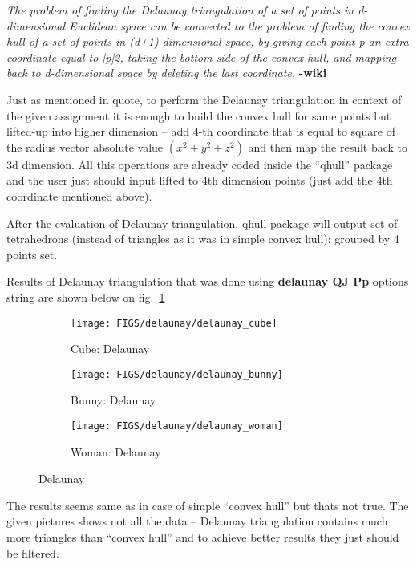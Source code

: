 \documentclass[11pt]{article}
\begin{document}
\textit{The problem of finding the Delaunay triangulation of a set of points in d-dimensional Euclidean space can be converted to the problem of finding the convex hull of a set of points in (d+1)-dimensional space, by giving each point p an extra coordinate equal to |p|2, taking the bottom side of the convex hull, and mapping back to d-dimensional space by deleting the last coordinate.} \textbf{-wiki}

Just as mentioned in quote, to perform the Delaunay triangulation in context of the given assignment it is enough to build the convex hull for same points but lifted-up into higher dimension – add 4-th coordinate that is equal to square of the radius vector absolute value $(x^2+y^2+z^2)$ and then map the result back to 3d dimension. All this operations are already coded inside the “qhull” package and the user just should input lifted to 4th dimension points (just add the 4th coordinate mentioned above).

After the evaluation of Delaunay triangulation, qhull package will output set of tetrahedrons (instead of triangles as it was in simple convex hull): grouped by 4 points set.

Results of Delaunay triangulation that was done using \textbf{delaunay QJ Pp} options string are shown below on fig.~\ref{fig:delaunay}
\begin{figure}[h]
    \begin{subfigure}{.3\textwidth}
        \centering
        \texttt{[image: FIGS/delaunay/delaunay\_cube]}
        \caption{Cube: Delaunay}
    \end{subfigure}
    \begin{subfigure}{.3\textwidth}
        \centering
        \texttt{[image: FIGS/delaunay/delaunay\_bunny]}
        \caption{Bunny: Delaunay}
    \end{subfigure}
    \begin{subfigure}{.3\textwidth}
        \centering
        \texttt{[image: FIGS/delaunay/delaunay\_woman]}
        \caption{Woman: Delaunay}
    \end{subfigure}
    \caption{Delaunay}
    \label{fig:delaunay}
\end{figure}

The results seems same as in case of simple “convex hull” but thats not true. The given pictures shows not all the data – Delaunay triangulation contains much more triangles than “convex hull” and to achieve better results they just should be filtered.
\end{document}
